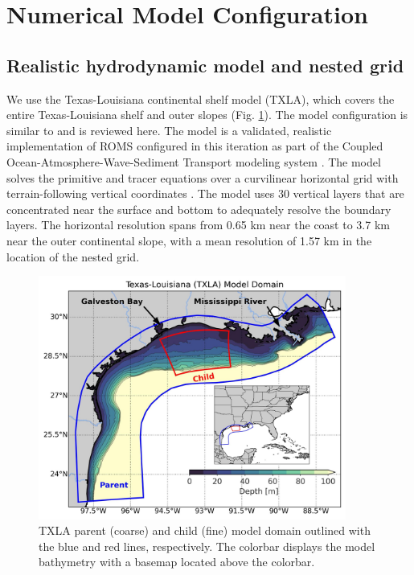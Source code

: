 \section{Numerical Model Configuration} \label{sec:numerical}

\subsection{Realistic hydrodynamic model and nested grid}

We use the Texas-Louisiana continental shelf model (TXLA), which covers the entire Texas-Louisiana shelf and outer slopes (Fig. \ref{fig:domain_overview}). The model configuration is similar to \citet{Qu_2022_NIW} and is reviewed here. The model is a validated, realistic implementation of ROMS configured in this iteration as part of the Coupled Ocean-Atmosphere-Wave-Sediment Transport modeling system \citep{Warner_2010}. The model solves the primitive and tracer equations over a curvilinear horizontal grid with terrain-following vertical coordinates \citep{Arakawa_1977, shchepetkin2005regional, Zhang_2012_forecast}. The model uses 30 vertical layers that are concentrated near the surface and bottom to adequately resolve the boundary layers. The horizontal resolution spans from 0.65 km near the coast to 3.7 km near the outer continental slope, with a mean resolution of 1.57 km in the location of the nested grid. 

\begin{figure}[h]
    \centerline{\includegraphics[width=0.9\textwidth]{figures/james_2023/Figure1_domain.jpg}}
    \caption{TXLA parent (coarse) and child (fine) model domain outlined with the blue and red lines, respectively. The colorbar displays the model bathymetry with a basemap located above the colorbar.}
    \label{fig:domain_overview}
\end{figure}

